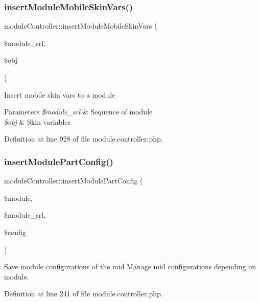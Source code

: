 \subsubsection{\texorpdfstring{insert\+Module\+Mobile\+Skin\+Vars()}{insertModuleMobileSkinVars()}}
{\footnotesize\ttfamily module\+Controller\+::insert\+Module\+Mobile\+Skin\+Vars (\begin{DoxyParamCaption}\item[{}]{\$module\+\_\+srl,  }\item[{}]{\$obj }\end{DoxyParamCaption})}

Insert mobile skin vars to a module 
\begin{DoxyParams}{Parameters}
{\em \$module\+\_\+srl} & Sequence of module \\
\hline
{\em \$obj} & Skin variables \\
\hline
\end{DoxyParams}


Definition at line 928 of file module.\+controller.\+php.

\hypertarget{classmoduleController_a7def19c7b7f3f3e0d97a2183d58d62eb}{}\label{classmoduleController_a7def19c7b7f3f3e0d97a2183d58d62eb} 
\subsubsection{\texorpdfstring{insert\+Module\+Part\+Config()}{insertModulePartConfig()}}
{\footnotesize\ttfamily module\+Controller\+::insert\+Module\+Part\+Config (\begin{DoxyParamCaption}\item[{}]{\$module,  }\item[{}]{\$module\+\_\+srl,  }\item[{}]{\$config }\end{DoxyParamCaption})}



Save module configurations of the mid Manage mid configurations depending on module. 



Definition at line 241 of file module.\+controller.\+php.

\hypertarget{classmoduleController_ad044df4dde2053b5dcbaf5077822290c}{}\label{classmoduleController_ad044df4dde2053b5dcbaf5077822290c} 
